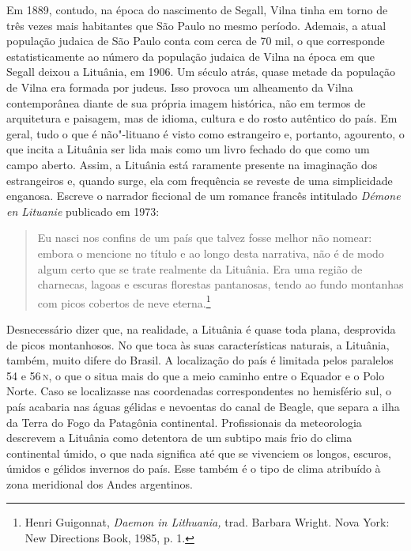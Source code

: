 Em 1889, contudo, na
época do nascimento de Segall, Vilna tinha em torno de três vezes mais
habitantes que São Paulo no mesmo período. Ademais, a atual população
judaica de São Paulo conta com cerca de 70 mil, o que corresponde
estatisticamente ao número da população judaica de Vilna na época em que
Segall deixou a Lituânia, em 1906. Um século atrás, quase metade da
população de Vilna era formada por judeus. Isso provoca um alheamento da
Vilna contemporânea diante de sua própria imagem histórica, não em
termos de arquitetura e paisagem, mas de idioma, cultura e do rosto
autêntico do país. Em geral, tudo o que é não"-lituano é visto como
estrangeiro e, portanto, agourento, o que incita a Lituânia ser lida
mais como um livro fechado do que como um campo aberto. Assim, a
Lituânia está raramente presente na imaginação dos estrangeiros e,
quando surge, ela com frequência se reveste de uma simplicidade
enganosa. Escreve o narrador ficcional de um romance
francês intitulado \textit{Démone en Lituanie} publicado em 1973: 

\begin{quote}
Eu nasci nos
confins de um país que talvez fosse melhor não nomear: embora o
mencione no título e ao longo desta narrativa, não é de modo algum certo
que se trate realmente da Lituânia. Era uma região de charnecas, lagoas
e escuras florestas pantanosas, tendo ao fundo montanhas com picos
cobertos de neve eterna.\footnote{Henri Guigonnat, \textit{Daemon in
  Lithuania,} trad. Barbara Wright. Nova York: New Directions Book,
  1985, p. 1.} 
\end{quote}


Desnecessário dizer que, na realidade, a Lituânia é quase
toda plana, desprovida de picos montanhosos. No que toca às suas características naturais, a Lituânia, também, muito
difere do Brasil. A localização do país é limitada pelos paralelos 54 e
56\,\textsc{n}, o que o situa mais do que a meio caminho entre o Equador e o
Polo Norte. Caso se localizasse nas coordenadas correspondentes no
hemisfério sul, o país acabaria nas águas gélidas e nevoentas do canal
de Beagle, que separa a ilha da Terra do Fogo da Patagônia continental.
Profissionais da meteorologia descrevem a Lituânia como detentora de um
subtipo mais frio do clima continental úmido, o que nada significa até
que se vivenciem os longos, escuros, úmidos e gélidos invernos do país.
Esse também é o tipo de clima atribuído à zona meridional dos Andes
argentinos. 

